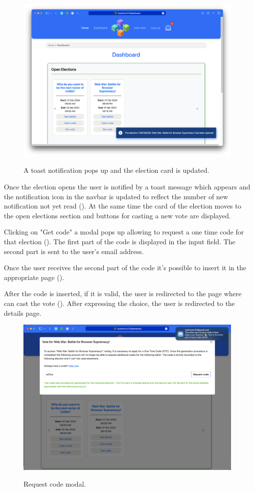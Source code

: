 \documentclass{scrartcl}
\begin{document}
\begin{figure}
    \centering
    \includegraphics[width=0.9\linewidth]{figures/story-board/8-notifications.png}
    \label{fig:notifications}
    \caption{A toast notification pops up and the election card is updated.}
\end{figure}
\restoregeometry

Once the election opens the user is notified by a toast message which appears and the notification icon in the navbar is updated to reflect the number of new notification not yet read ().
%
At the same time the card of the election moves to the open elections section and buttons for casting a new vote are displayed.

Clicking on "Get code" a modal pops up allowing to request a one time code for that election ().
%
The first part of the code is displayed in the input field.
%
The second part is sent to the user's email address.

Once the user receives the second part of the code it's possible to insert it in the appropriate page ().

After the code is inserted, if it is valid, the user is redirected to the page where can cast the vote ().
%
After expressing the choice, the user is redirected to the details page.

\begin{figure}
    \centering
    \includegraphics[width=0.8\linewidth]{figures/story-board/9-request-code.png}
    \label{fig:request-code}
    \caption{Request code modal.}
\end{figure}
\end{document}
